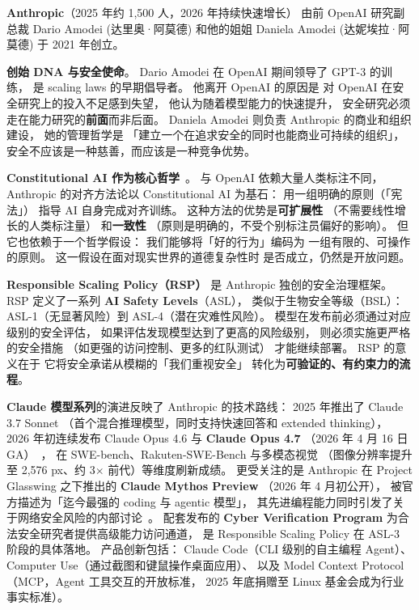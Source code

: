 \textbf{Anthropic}（2025 年约 1,500 人，2026 年持续快速增长）
由前 OpenAI 研究副总裁 Dario Amodei (达里奥·阿莫德)
和他的姐姐 Daniela Amodei (达妮埃拉·阿莫德)
于 2021 年创立。

\textbf{创始 DNA 与安全使命}。
Dario Amodei 在 OpenAI 期间领导了 GPT-3 的训练，
是 scaling laws 的早期倡导者。
他离开 OpenAI 的原因是
对 OpenAI 在安全研究上的投入不足感到失望，
他认为随着模型能力的快速提升，
安全研究必须走在能力研究的\textbf{前面}而非后面。
Daniela Amodei 则负责 Anthropic 的商业和组织建设，
她的管理哲学是
「建立一个在追求安全的同时也能商业可持续的组织」，
安全不应该是一种慈善，而应该是一种竞争优势。

\textbf{Constitutional AI 作为核心哲学}~\cite{bai2022constitutional}。
与 OpenAI 依赖大量人类标注不同，
Anthropic 的对齐方法论以 Constitutional AI 为基石：
用一组明确的原则（「宪法」）
指导 AI 自身完成对齐训练。
这种方法的优势是\textbf{可扩展性}
（不需要线性增长的人类标注量）
和\textbf{一致性}
（原则是明确的，不受个别标注员偏好的影响）。
但它也依赖于一个哲学假设：
我们能够将「好的行为」编码为
一组有限的、可操作的原则。
这一假设在面对现实世界的道德复杂性时
是否成立，仍然是开放问题。

\textbf{Responsible Scaling Policy（RSP）}
是 Anthropic 独创的安全治理框架。
RSP 定义了一系列 \textbf{AI Safety Levels}（ASL），
类似于生物安全等级（BSL）：
ASL-1（无显著风险）到 ASL-4（潜在灾难性风险）。
模型在发布前必须通过对应级别的安全评估，
如果评估发现模型达到了更高的风险级别，
则必须实施更严格的安全措施
（如更强的访问控制、更多的红队测试）
才能继续部署。
RSP 的意义在于
它将安全承诺从模糊的「我们重视安全」
转化为\textbf{可验证的、有约束力的流程}。

\textbf{Claude 模型系列}的演进反映了 Anthropic 的技术路线：
2025 年推出了 Claude 3.7 Sonnet
（首个混合推理模型，同时支持快速回答和 extended thinking），
2026 年初连续发布 Claude Opus 4.6 与 \textbf{Claude Opus 4.7}
（2026 年 4 月 16 日 GA）~\cite{anthropic_opus47_release_2026}，
在 SWE-bench、Rakuten-SWE-Bench 与多模态视觉
（图像分辨率提升至 2,576 px、约 3$\times$ 前代）等维度刷新成绩。
更受关注的是
Anthropic 在 Project Glasswing 之下推出的 \textbf{Claude Mythos Preview}
（2026 年 4 月初公开），
被官方描述为「迄今最强的 coding 与 agentic 模型」，
其先进编程能力同时引发了关于网络安全风险的内部讨论~\cite{anthropic_mythos_2026}。
配套发布的 \textbf{Cyber Verification Program}
为合法安全研究者提供高级能力访问通道，
是 Responsible Scaling Policy 在 ASL-3 阶段的具体落地。
产品创新包括：
Claude Code（CLI 级别的自主编程 Agent）、
Computer Use（通过截图和键鼠操作桌面应用）、
以及 Model Context Protocol（MCP，Agent 工具交互的开放标准，
2025 年底捐赠至 Linux 基金会成为行业事实标准）。

